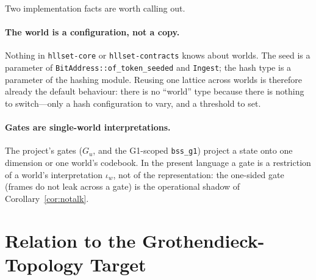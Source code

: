 \documentclass[11pt,a4paper]{article}
\theoremstyle{remark}
\newcommand{\iotaw}{\ensuremath{\iota_{w}}}         %
\begin{document}
Two implementation facts are worth calling out.

\paragraph{The world is a configuration, not a copy.}
Nothing in \texttt{hllset-core} or \texttt{hllset-contracts} knows about worlds.
The seed is a parameter of \texttt{BitAddress::of\_token\_seeded} and
\texttt{Ingest}; the hash type is a parameter of the hashing module. Reusing one
lattice across worlds is therefore already the default behaviour: there is no
``world'' type because there is nothing to switch---only a hash configuration to
vary, and a threshold to set.

\paragraph{Gates are single-world interpretations.}
The project's gates ($G_u$, and the G1-scoped \texttt{bss\_g1}) project a state
onto one dimension or one world's codebook. In the present language a gate is a
restriction of a world's interpretation $\iotaw$, not of the representation:
the one-sided gate (frames do not leak across a gate) is the operational shadow
of Corollary~\ref{cor:notalk}.

\section{Relation to the Grothendieck-Topology Target}
\end{document}

